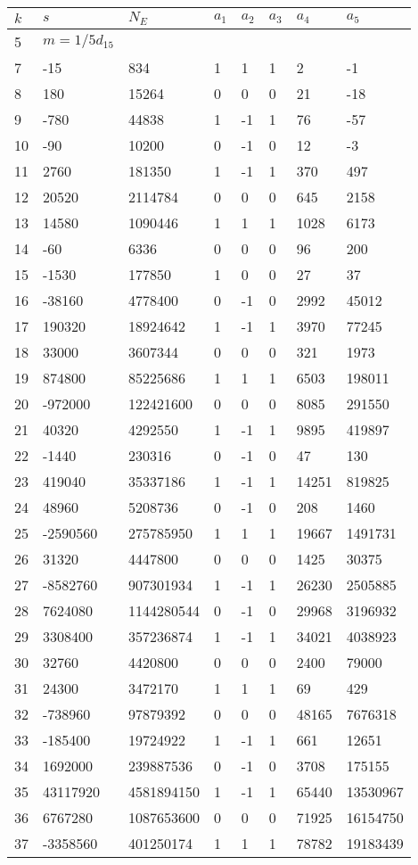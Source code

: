 \documentclass{amsart}
\begin{document}
\begin{longtable}{|l|l|l|lllll|}
\hline
$k$ & $s$ & $N_E$ & $a_1$ & $a_2$ & $a_3$ & $a_4$ & $a_5$\\
\hline
5&$m=1/5d_{15}$&&\multicolumn{5}{c|}{}\\
7&-15&834&1&1&1&2&-1\\
8&180&15264&0&0&0&21&-18\\
9&-780&44838&1&-1&1&76&-57\\
10&-90&10200&0&-1&0&12&-3\\
11&2760&181350&1&-1&1&370&497\\
12&20520&2114784&0&0&0&645&2158\\
13&14580&1090446&1&1&1&1028&6173\\
14&-60&6336&0&0&0&96&200\\
15&-1530&177850&1&0&0&27&37\\
16&-38160&4778400&0&-1&0&2992&45012\\
17&190320&18924642&1&-1&1&3970&77245\\
18&33000&3607344&0&0&0&321&1973\\
19&874800&85225686&1&1&1&6503&198011\\
20&-972000&122421600&0&0&0&8085&291550\\
21&40320&4292550&1&-1&1&9895&419897\\
22&-1440&230316&0&-1&0&47&130\\
23&419040&35337186&1&-1&1&14251&819825\\
24&48960&5208736&0&-1&0&208&1460\\
25&-2590560&275785950&1&1&1&19667&1491731\\
26&31320&4447800&0&0&0&1425&30375\\
27&-8582760&907301934&1&-1&1&26230&2505885\\
28&7624080&1144280544&0&-1&0&29968&3196932\\
29&3308400&357236874&1&-1&1&34021&4038923\\
30&32760&4420800&0&0&0&2400&79000\\
31&24300&3472170&1&1&1&69&429\\
32&-738960&97879392&0&0&0&48165&7676318\\
33&-185400&19724922&1&-1&1&661&12651\\
34&1692000&239887536&0&-1&0&3708&175155\\
35&43117920&4581894150&1&-1&1&65440&13530967\\
36&6767280&1087653600&0&0&0&71925&16154750\\
37&-3358560&401250174&1&1&1&78782&19183439\\

\end{longtable}
\end{document}
